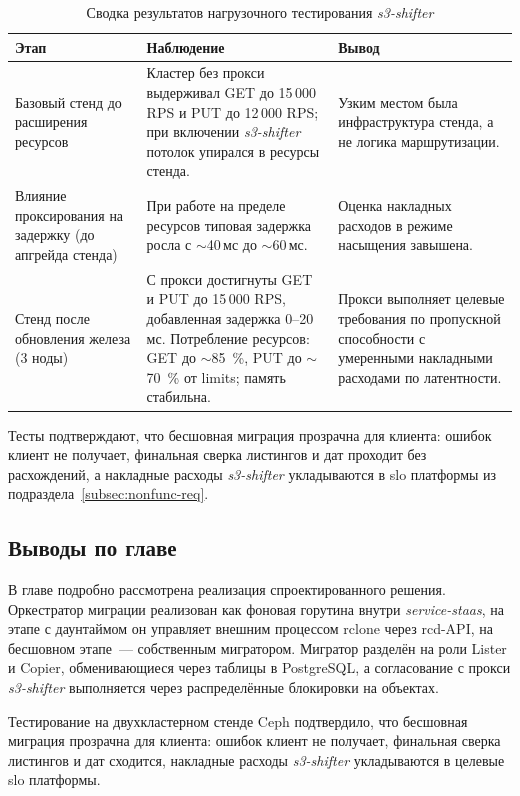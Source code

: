 \begin{table}[H]
\centering
\footnotesize
\renewcommand{\arraystretch}{1.2}
\begin{tabular}{|p{2.8cm}|p{5.5cm}|p{5.5cm}|}
\hline
\textbf{Этап} & \textbf{Наблюдение} & \textbf{Вывод} \\
\hline
Базовый стенд до расширения ресурсов &
Кластер без прокси выдерживал GET до 15\,000 RPS и PUT до 12\,000 RPS; при включении \textit{s3-shifter} потолок упирался в ресурсы стенда. &
Узким местом была инфраструктура стенда, а не логика маршрутизации. \\
\hline
Влияние проксирования на задержку (до апгрейда стенда) &
При работе на пределе ресурсов типовая задержка росла с $\sim$40\,мс до $\sim$60\,мс. &
Оценка накладных расходов в режиме насыщения завышена. \\
\hline
Стенд после обновления железа (3 ноды) &
С прокси достигнуты GET и PUT до 15\,000 RPS, добавленная задержка 0--20\,мс. Потребление ресурсов: GET до $\sim$85~\%, PUT до $\sim$70~\% от limits; память стабильна. &
Прокси выполняет целевые требования по пропускной способности с умеренными накладными расходами по латентности. \\
\hline
\end{tabular}
\caption{Сводка результатов нагрузочного тестирования \textit{s3-shifter}}
\label{tab:proxy-load-results}
\end{table}

Тесты подтверждают, что бесшовная миграция прозрачна для клиента: ошибок клиент не получает, финальная сверка листингов и дат проходит без расхождений, а накладные расходы \textit{s3-shifter} укладываются в \gls{slo} платформы из подраздела~\ref{subsec:nonfunc-req}.

\subsection{Выводы по главе}\label{subsec:ch3-summary}

В главе подробно рассмотрена реализация спроектированного решения.
Оркестратор миграции реализован как фоновая горутина внутри \textit{service-staas}, на этапе с даунтаймом он управляет внешним процессом \gls{rclone} через rcd-API, на бесшовном этапе~--- собственным мигратором.
Мигратор разделён на роли Lister и Copier, обменивающиеся через таблицы в PostgreSQL, а согласование с прокси \textit{s3-shifter} выполняется через распределённые блокировки на объектах.

Тестирование на двухкластерном стенде Ceph подтвердило, что бесшовная миграция прозрачна для клиента: ошибок клиент не получает, финальная сверка листингов и дат сходится, накладные расходы \textit{s3-shifter} укладываются в целевые \gls{slo} платформы.
